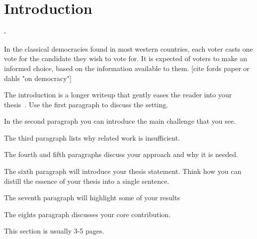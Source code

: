 \chapter{Introduction}

- 

In the classical democracies found in most western countries, each voter casts one vote for the candidate they wish to vote for. It is expected of voters to make an informed choice, based on the information available to them.  [cite fords paper or dahls "on democracy"] 

The introduction is a longer writeup that gently eases the reader into your
thesis~\cite{dinesh20oakland}. Use the first paragraph to discuss the setting.

In the second paragraph you can introduce the main challenge that you see.

The third paragraph lists why related work is insufficient.

The fourth and fifth paragraphs discuss your approach and why it is needed.

The sixth paragraph will introduce your thesis statement. Think how you can
distill the essence of your thesis into a single sentence.

The seventh paragraph will highlight some of your results

The eights paragraph discusses your core contribution.

This section is usually 3-5 pages.